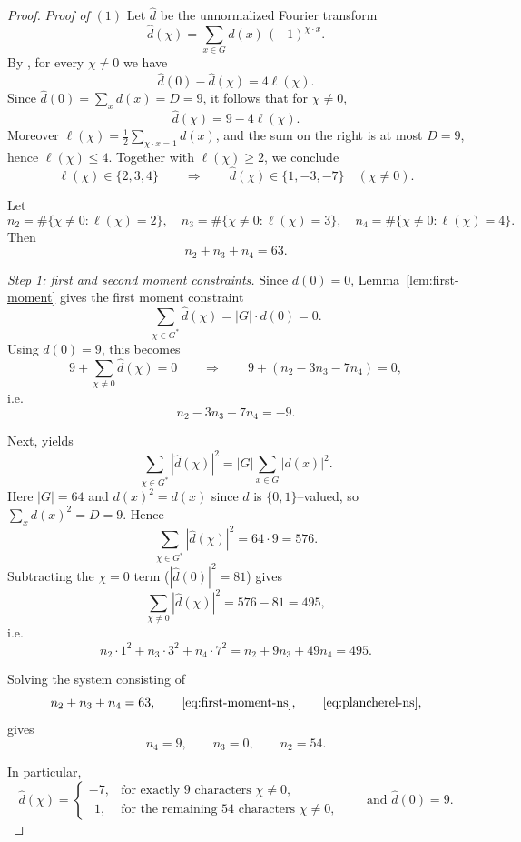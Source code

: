 \documentclass[12pt,twoside,]{amsart}
\theoremstyle{plain}
\theoremstyle{definition}
\begin{document}
\begin{proof}
\noindent\textit{Proof of $(1)$} Let $\widehat d$ be the unnormalized Fourier transform
\[
\widehat d(\chi)=\sum_{x\in G} d(x)\,(-1)^{\chi\cdot x}.
\]
By , for every $\chi\neq 0$ we have
\[
\widehat d(0)-\widehat d(\chi)=4\ell(\chi).
\]
Since $\widehat d(0)=\sum_x d(x)=D=9$, it follows that for $\chi\neq 0$,
\[
\widehat d(\chi)=9-4\ell(\chi).
\]
Moreover $\ell(\chi)=\tfrac12\sum_{\chi\cdot x=1} d(x)$, and the sum on the right is at most
$D=9$, hence $\ell(\chi)\le 4$. Together with $\ell(\chi)\ge 2$, we conclude
\[
\ell(\chi)\in\{2,3,4\}
\qquad\Longrightarrow\qquad
\widehat d(\chi)\in\{1,-3,-7\}\quad(\chi\neq 0).
\]

Let
\[
n_2=\#\{\chi\neq 0:\ell(\chi)=2\},\quad
n_3=\#\{\chi\neq 0:\ell(\chi)=3\},\quad
n_4=\#\{\chi\neq 0:\ell(\chi)=4\}.
\]
Then
\[
n_2+n_3+n_4=63.
\]

\medskip\noindent
\emph{Step 1: first and second moment constraints.}
Since $d(0)=0$, Lemma~\ref{lem:first-moment} gives the first moment constraint
\[
\sum_{\chi\in G^*}\widehat d(\chi)=|G|\cdot d(0)=0.
\]
Using $\widehat d(0)=9$, this becomes
\[
9+\sum_{\chi\neq 0}\widehat d(\chi)=0
\qquad\Longrightarrow\qquad
9+(n_2-3n_3-7n_4)=0,
\]
i.e.
\begin{equation}\label{eq:first-moment-ns}
n_2-3n_3-7n_4=-9.
\end{equation}

Next,  yields
\[
\sum_{\chi\in G^*}|\widehat d(\chi)|^2 = |G|\sum_{x\in G}|d(x)|^2.
\]
Here $|G|=64$ and $d(x)^2=d(x)$ since $d$ is $\{0,1\}$--valued, so $\sum_x d(x)^2=D=9$.
Hence
\[
\sum_{\chi\in G^*}|\widehat d(\chi)|^2=64\cdot 9=576.
\]
Subtracting the $\chi=0$ term ($|\widehat d(0)|^2=81$) gives
\[
\sum_{\chi\neq 0}|\widehat d(\chi)|^2=576-81=495,
\]
i.e.
\begin{equation}\label{eq:plancherel-ns}
n_2\cdot 1^2+n_3\cdot 3^2+n_4\cdot 7^2
=
n_2+9n_3+49n_4
=
495.
\end{equation}

Solving the system consisting of
\[
n_2+n_3+n_4=63,
\qquad
\eqref{eq:first-moment-ns},
\qquad
\eqref{eq:plancherel-ns},
\]
gives
\[
n_4=9,\qquad n_3=0,\qquad n_2=54.
\]

In particular,
\begin{equation}\label{eq:rigid-spectrum}
\widehat d(\chi)=
\begin{cases}
-7,& \text{for exactly }9\text{ characters }\chi\neq 0,\\
\ \ 1,& \text{for the remaining }54\text{ characters }\chi\neq 0,
\end{cases}
\qquad\text{and }\widehat d(0)=9.
\end{equation}


\end{proof}
\end{document}
